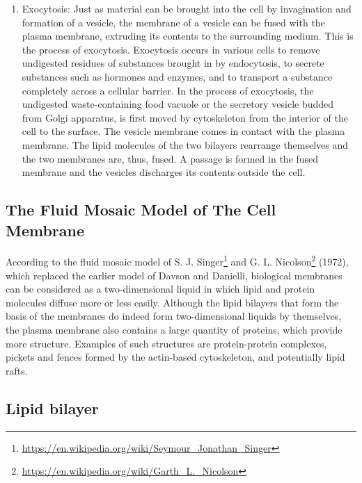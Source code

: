 \documentclass[
]{book}
\renewcommand{\href}[2]{#2\footnote{\url{#1}}}
\begin{document}
\begin{enumerate}
\item
  Exocytosis: Just as material can be brought into the cell by invagination and formation of a vesicle, the membrane of a vesicle can be fused with the plasma membrane, extruding its contents to the surrounding medium. This is the process of exocytosis. Exocytosis occurs in various cells to remove undigested residues of substances brought in by endocytosis, to secrete substances such as hormones and enzymes, and to transport a substance completely across a cellular barrier. In the process of exocytosis, the undigested waste-containing food vacuole or the secretory vesicle budded from Golgi apparatus, is first moved by cytoskeleton from the interior of the cell to the surface. The vesicle membrane comes in contact with the plasma membrane. The lipid molecules of the two bilayers rearrange themselves and the two membranes are, thus, fused. A passage is formed in the fused membrane and the vesicles discharges its contents outside the cell.
\end{enumerate}

\hypertarget{the-fluid-mosaic-model-of-the-cell-membrane}{%
\subsection{The Fluid Mosaic Model of The Cell Membrane}\label{the-fluid-mosaic-model-of-the-cell-membrane}}

According to the fluid mosaic model of \href{https://en.wikipedia.org/wiki/Seymour_Jonathan_Singer}{S. J. Singer} and \href{https://en.wikipedia.org/wiki/Garth_L._Nicolson}{G. L. Nicolson} (1972), which replaced the earlier model of Davson and Danielli, biological membranes can be considered as a two-dimensional liquid in which lipid and protein molecules diffuse more or less easily. Although the lipid bilayers that form the basis of the membranes do indeed form two-dimensional liquids by themselves, the plasma membrane also contains a large quantity of proteins, which provide more structure. Examples of such structures are protein-protein complexes, pickets and fences formed by the actin-based cytoskeleton, and potentially lipid rafts.

\hypertarget{lipid-bilayer}{%
\subsection{Lipid bilayer}\label{lipid-bilayer}}
\end{document}
